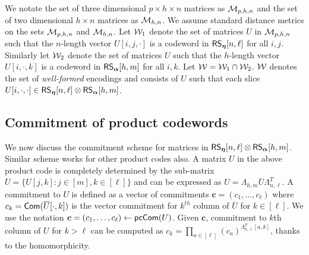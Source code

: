 We notate the set of three dimensional $p\times h\times n$ matrices as $\mathcal{M}_{p,h,n}$ and
the set of two dimensional $h\times n$ matrices as $\mathcal{M}_{h, n}$. We
assume standard distance metrics on the sets $\mathcal{M}_{p,h,n}$ and $\mathcal{M}_{h,n}$.
Let $\mathcal{W}_1$ denote the set of matrices
$U$ in $\mathcal{M}_{p,h,n}$ such that the $n$-length vector $U[i,j,\cdot]$ is a
codeword in $\mathsf{RS}_{\bm{\eta}}[n,\ell]$ for all $i,j$. Similarly let $\mathcal{W}_2$ denote the set of
matrices $U$ such that the $h$-length vector $U[i,\cdot,k]$ is a codeword in
$\mathsf{RS}_{\bm{\alpha}}[h,m]$ for all $i,k$.  Let $\mathcal{W}=\mathcal{W}_1\cap \mathcal{W}_2$. $\mathcal{W}$ denotes the set of {\em well-formed} encodings  and consists of $U$ such that each slice $U[i,\cdot,\cdot]\in \mathsf{RS}_{\bm{\eta}}[n,\ell]\otimes \mathsf{RS}_{\bm{\alpha}}[h,m]$. 

\begin{comment}
We now fix the notation for some of the codes that will be
frequently used throughout this section. We use $L_1$ and $L_2$ to denote codes
$\rsc{\eta}{n,\ell}$ and $\rsc{\alpha}{h,m}$ respectively. Let $\mc{C}_1 := \ric{L_1}{h}$ 
and $\mc{C}_2 :=\cic{L_2}{n}$ denote the interleaved codes of $L_1$ and $L_2$. In addition, 
we use codes $L_3 := \rsc{\eta}{n,s+\ell-1}$, $L_4 := \rsc{\eta}{n,2\ell-1}$ and 
$L_5=\rsc{\alpha}{h,2m-1}$ to encode some intermediate computations in our protocols.
Let $\Lambda_{n,\ell}$ denote the matrix for the linear transformation that maps a vector $x\in \FF^\ell$ 
to the unique codeword $y$ in $L_1$ such that $y_i=x_i$ for $i\in [\ell]$. Thus $\Lambda_{n,\ell}$ is 
an $n\times \ell$ matrix. Let
$\Lambda_{h,m},\Lambda_{n,s+\ell-1},\Lambda_{n,2\ell-1}$ and $\Lambda_{h,2m-1}$ be similar matrices
for the codes $L_2,L_3,L_4$ and $L_5$ respectively. We denote the
parity check matrices for $L_i$  by $\mc{H}_i$ for $i\in \{1,\ldots,5\}$. 
We notate the set of three dimensional $p\times h\times n$ matrices as $\mc{M}_{p,h,n}$ and
the set of two dimensional $h\times n$ matrices as $\mc{M}_{h, n}$. We
assume standard distance metrics on the sets $\mc{M}_{p,h,n}$ and $\mc{M}_{h,n}$.
\end{comment}

\subsection{Commitment of product codewords}\label{sec:matrixcommitment}

We now discuss the commitment scheme for matrices in $\mathsf{RS}_{\bm{\eta}}[n,\ell] \otimes \mathsf{RS}_{\bm{\alpha}}[h,m]$. Similar scheme works for other product codes also. 
A matrix $U$ in the above product code is
completely determined by the sub-matrix $\overline{U}=\{U[j,k]: j\in [m], k\in [\ell]\}$ and can be expressed as $U=\Lambda_{h,m}\overline{U}\Lambda_{n,\ell}^T$. 
A commitment to $U$ is defined as  a vector of commitments $\bm{c}=(c_1,\ldots,c_\ell)$
where $c_k=\mathsf{Com}(\overline{U}[\cdot,k])$ is the vector commitment for $k^{th}$
column of $\overline{U}$ for $k\in [\ell]$. We use the notation $\bm{c} = (c_1,\ldots,c_\ell) \gets \mathsf{pcCom}(U)$. Given $\bm{c}$, commitment to $k$th column of $U$ for $k > \ell$ 
can be computed as  $c_k=\prod_{a\in [\ell]}(c_a)^{\Lambda_{n,\ell}^T[a,k]}$, thanks to the homomorphicity.

